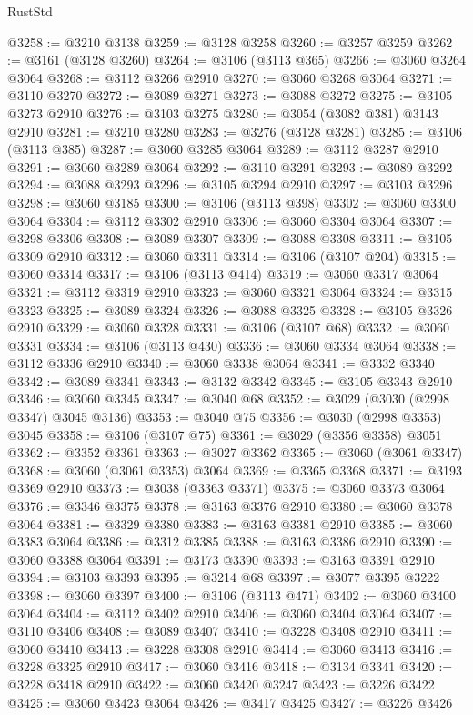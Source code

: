 \begin{lexlean}{RustStd}
\begin{coremodule}
@3258 := @3210 @3138
@3259 := @3128 @3258
@3260 := @3257 @3259
@3262 := @3161 (@3128 @3260)
@3264 := @3106 (@3113 @365)
@3266 := @3060 @3264 @3064
@3268 := @3112 @3266 @2910
@3270 := @3060 @3268 @3064
@3271 := @3110 @3270
@3272 := @3089 @3271
@3273 := @3088 @3272
@3275 := @3105 @3273 @2910
@3276 := @3103 @3275
@3280 := @3054 (@3082 @381) @3143 @2910
@3281 := @3210 @3280
@3283 := @3276 (@3128 @3281)
@3285 := @3106 (@3113 @385)
@3287 := @3060 @3285 @3064
@3289 := @3112 @3287 @2910
@3291 := @3060 @3289 @3064
@3292 := @3110 @3291
@3293 := @3089 @3292
@3294 := @3088 @3293
@3296 := @3105 @3294 @2910
@3297 := @3103 @3296
@3298 := @3060 @3185
@3300 := @3106 (@3113 @398)
@3302 := @3060 @3300 @3064
@3304 := @3112 @3302 @2910
@3306 := @3060 @3304 @3064
@3307 := @3298 @3306
@3308 := @3089 @3307
@3309 := @3088 @3308
@3311 := @3105 @3309 @2910
@3312 := @3060 @3311
@3314 := @3106 (@3107 @204)
@3315 := @3060 @3314
@3317 := @3106 (@3113 @414)
@3319 := @3060 @3317 @3064
@3321 := @3112 @3319 @2910
@3323 := @3060 @3321 @3064
@3324 := @3315 @3323
@3325 := @3089 @3324
@3326 := @3088 @3325
@3328 := @3105 @3326 @2910
@3329 := @3060 @3328
@3331 := @3106 (@3107 @68)
@3332 := @3060 @3331
@3334 := @3106 (@3113 @430)
@3336 := @3060 @3334 @3064
@3338 := @3112 @3336 @2910
@3340 := @3060 @3338 @3064
@3341 := @3332 @3340
@3342 := @3089 @3341
@3343 := @3132 @3342
@3345 := @3105 @3343 @2910
@3346 := @3060 @3345
@3347 := @3040 @68
@3352 := @3029 (@3030 (@2998 @3347) @3045 @3136)
@3353 := @3040 @75
@3356 := @3030 (@2998 @3353) @3045
@3358 := @3106 (@3107 @75)
@3361 := @3029 (@3356 @3358) @3051
@3362 := @3352 @3361
@3363 := @3027 @3362
@3365 := @3060 (@3061 @3347)
@3368 := @3060 (@3061 @3353) @3064
@3369 := @3365 @3368
@3371 := @3193 @3369 @2910
@3373 := @3038 (@3363 @3371)
@3375 := @3060 @3373 @3064
@3376 := @3346 @3375
@3378 := @3163 @3376 @2910
@3380 := @3060 @3378 @3064
@3381 := @3329 @3380
@3383 := @3163 @3381 @2910
@3385 := @3060 @3383 @3064
@3386 := @3312 @3385
@3388 := @3163 @3386 @2910
@3390 := @3060 @3388 @3064
@3391 := @3173 @3390
@3393 := @3163 @3391 @2910
@3394 := @3103 @3393
@3395 := @3214 @68
@3397 := @3077 @3395 @3222
@3398 := @3060 @3397
@3400 := @3106 (@3113 @471)
@3402 := @3060 @3400 @3064
@3404 := @3112 @3402 @2910
@3406 := @3060 @3404 @3064
@3407 := @3110 @3406
@3408 := @3089 @3407
@3410 := @3228 @3408 @2910
@3411 := @3060 @3410
@3413 := @3228 @3308 @2910
@3414 := @3060 @3413
@3416 := @3228 @3325 @2910
@3417 := @3060 @3416
@3418 := @3134 @3341
@3420 := @3228 @3418 @2910
@3422 := @3060 @3420 @3247
@3423 := @3226 @3422
@3425 := @3060 @3423 @3064
@3426 := @3417 @3425
@3427 := @3226 @3426

\end{coremodule}
\end{lexlean}

